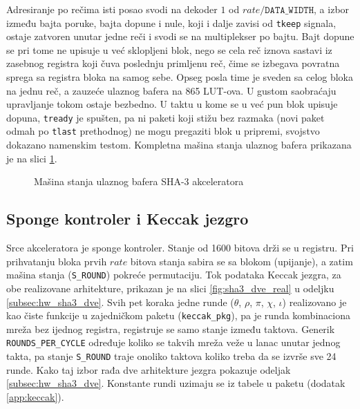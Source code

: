 \smallbreak
Adresiranje po rečima isti posao svodi na dekoder $1$ od $rate/\texttt{DATA\_WIDTH}$, a izbor između bajta poruke, bajta dopune i nule, koji i dalje zavisi od \texttt{tkeep} signala, ostaje zatvoren unutar jedne reči i svodi se na multiplekser po bajtu. Bajt dopune se pri tome ne upisuje u već sklopljeni blok, nego se cela reč iznova sastavi iz zasebnog registra koji čuva poslednju primljenu reč, čime se izbegava povratna sprega sa registra bloka na samog sebe. Opseg posla time je sveden sa celog bloka na jednu reč, a zauzeće ulaznog bafera na 865 LUT-ova.
\smallbreak
U gustom saobraćaju upravljanje tokom ostaje bezbedno. U taktu u kome se u već pun blok upisuje dopuna, \texttt{tready} je spušten, pa ni paketi koji stižu bez razmaka (novi paket odmah po \texttt{tlast} prethodnog) ne mogu pregaziti blok u pripremi, svojstvo dokazano namenskim testom. Kompletna mašina stanja ulaznog bafera prikazana je na slici \ref{fig:sha3_ib_fsm}.

\begin{figure}[H]
\centering
{}
\caption{Mašina stanja ulaznog bafera SHA-3 akceleratora}
\label{fig:sha3_ib_fsm}
\end{figure}

\subsection{Sponge kontroler i Keccak jezgro}
\label{subsec:hw_sha3_sponge}

Srce akceleratora je sponge kontroler. Stanje od 1600 bitova drži se u registru. Pri prihvatanju bloka prvih $rate$ bitova stanja sabira se sa blokom (upijanje), a zatim mašina stanja (\texttt{S\_ROUND}) pokreće permutaciju. Tok podataka Keccak jezgra, za obe realizovane arhitekture, prikazan je na slici \ref{fig:sha3_dve_real} u odeljku \ref{subsec:hw_sha3_dve}. Svih pet koraka jedne runde ($\theta$, $\rho$, $\pi$, $\chi$, $\iota$) realizovano je kao čiste funkcije u zajedničkom paketu (\texttt{keccak\_pkg}), pa je runda kombinaciona mreža bez ijednog registra, registruje se samo stanje između taktova. Generik \texttt{ROUNDS\_PER\_CYCLE} određuje koliko se takvih mreža veže u lanac unutar jednog takta, pa stanje \texttt{S\_ROUND} traje onoliko taktova koliko treba da se izvrše sve 24 runde. Kako taj izbor rađa dve arhitekture jezgra pokazuje odeljak \ref{subsec:hw_sha3_dve}. Konstante rundi uzimaju se iz tabele u paketu (dodatak \ref{app:keccak}).

